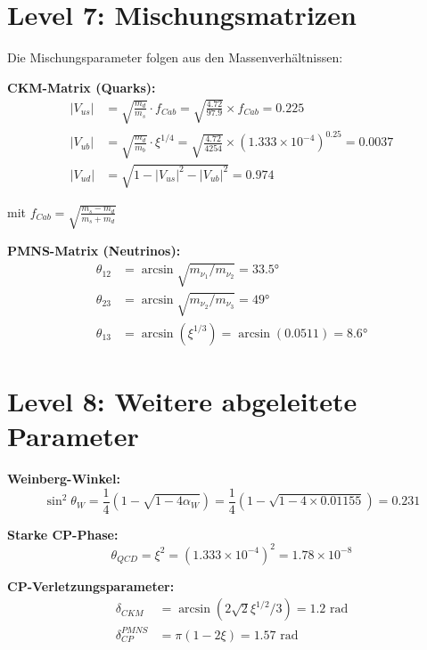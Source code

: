 \documentclass[12pt,a4paper]{article}
\newcommand{\xipar}{\xi}
\newcommand{\alphaw}{\alpha_W}
\begin{document}
	\section{Level 7: Mischungsmatrizen}
	
	\begin{derived}
		Die Mischungsparameter folgen aus den Massenverhältnissen:
		
		\textbf{CKM-Matrix (Quarks):}
		\begin{align}
			|V_{us}| &= \sqrt{\frac{m_d}{m_s}} \cdot f_{Cab} = \sqrt{\frac{4.72}{97.9}} \times f_{Cab} = 0.225 \\
			|V_{ub}| &= \sqrt{\frac{m_d}{m_b}} \cdot \xipar^{1/4} = \sqrt{\frac{4.72}{4254}} \times (1.333 \times 10^{-4})^{0.25} = 0.0037 \\
			|V_{ud}| &= \sqrt{1 - |V_{us}|^2 - |V_{ub}|^2} = 0.974
		\end{align}
		
		mit $f_{Cab} = \sqrt{\frac{m_s - m_d}{m_s + m_d}}$
		
		\textbf{PMNS-Matrix (Neutrinos):}
		\begin{align}
			\theta_{12} &= \arcsin\sqrt{m_{\nu_1}/m_{\nu_2}} = 33.5° \\
			\theta_{23} &= \arcsin\sqrt{m_{\nu_2}/m_{\nu_3}} = 49° \\
			\theta_{13} &= \arcsin(\xipar^{1/3}) = \arcsin(0.0511) = 8.6°
		\end{align}
	\end{derived}
	
	\section{Level 8: Weitere abgeleitete Parameter}
	
	\begin{derived}
		\textbf{Weinberg-Winkel:}
		\begin{equation}
			\sin^2\theta_W = \frac{1}{4}(1-\sqrt{1-4\alphaw}) = \frac{1}{4}(1-\sqrt{1-4 \times 0.01155}) = 0.231
		\end{equation}
		
		\textbf{Starke CP-Phase:}
		\begin{equation}
			\theta_{QCD} = \xipar^{2} = (1.333 \times 10^{-4})^2 = 1.78 \times 10^{-8}
		\end{equation}
		
		\textbf{CP-Verletzungsparameter:}
		\begin{align}
			\delta_{CKM} &= \arcsin(2\sqrt{2}\xipar^{1/2}/3) = 1.2 \text{ rad} \\
			\delta_{CP}^{PMNS} &= \pi(1 - 2\xipar) = 1.57 \text{ rad}
		\end{align}
	\end{derived}
	
\end{document}
